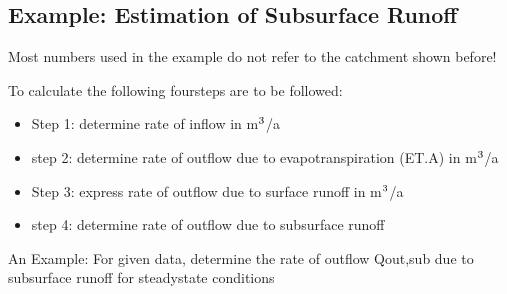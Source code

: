 \documentclass[letterpaper,10pt,english]{sphinxmanual}
\let\sphinxpxdimen\pdfpxdimen\else\newdimen\sphinxpxdimen
\begin{document}
\noindent{\hspace*{\fill}\sphinxincludegraphics[height=500\sphinxpxdimen]{{L01_f_9}.png}\hspace*{\fill}}


\subsection{Example: Estimation of Subsurface Runoff}
\label{\detokenize{contents/background/03_basic_hydrogeology:example-estimation-of-subsurface-runoff}}
Most numbers used in the example do not refer to the catchment shown before!

To calculate the following four\sphinxhyphen{}steps are to be followed:
\begin{itemize}
\item {} 
Step 1: determine rate of inflow in m\(\sp{\text{3}}\)/a

\item {} 
step 2: determine rate of outflow due to evapotranspiration (ET.A) in m\(\sp{\text{3}}\)/a

\item {} 
Step 3: express rate of outflow due to surface runoff in m\(\sp{\text{3}}\)/a

\item {} 
step 4: determine rate of outflow due to subsurface runoff

\end{itemize}

An Example:
For given data, determine the rate of outflow Qout,sub due to subsurface runoff for steady\sphinxhyphen{}state conditions
\end{document}
